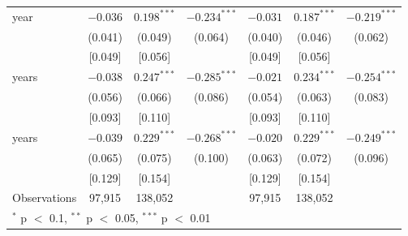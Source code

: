 \begin{tabular}{lcccccc}
\quad 1 year & $-0.036$ & $0.198^{***}$ & $-0.234^{***}$ & $-0.031$ & $0.187^{***}$ & $-0.219^{***}$ \\
 & (0.041) & (0.049) & (0.064) & (0.040) & (0.046) & (0.062) \\
 & [0.049] & [0.056] &  & [0.049] & [0.056] &  \\
\quad 2 years & $-0.038$ & $0.247^{***}$ & $-0.285^{***}$ & $-0.021$ & $0.234^{***}$ & $-0.254^{***}$ \\
 & (0.056) & (0.066) & (0.086) & (0.054) & (0.063) & (0.083) \\
 & [0.093] & [0.110] &  & [0.093] & [0.110] &  \\
\quad 3 years & $-0.039$ & $0.229^{***}$ & $-0.268^{***}$ & $-0.020$ & $0.229^{***}$ & $-0.249^{***}$ \\
 & (0.065) & (0.075) & (0.100) & (0.063) & (0.072) & (0.096) \\
 & [0.129] & [0.154] &  & [0.129] & [0.154] &  \\
\midrule
Observations & 97,915 & 138,052 &  & 97,915 & 138,052 &  \\
\bottomrule
\multicolumn{7}{l}{\footnotesize $^{*}$ p $<$ 0.1, $^{**}$ p $<$ 0.05, $^{***}$ p $<$ 0.01} \\
\end{tabular}
